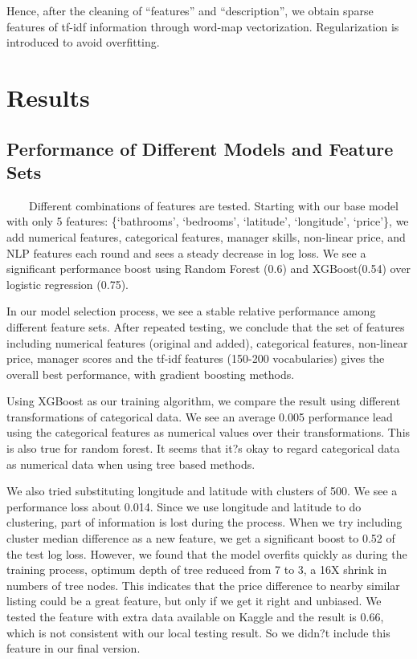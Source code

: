 \documentclass{article}
\begin{document}
Hence, after the cleaning of ``features'' and ``description'',  we obtain sparse features of tf-idf information through word-map vectorization. Regularization is introduced to avoid overfitting.

\section{Results} \label{results}

\subsection{Performance of Different Models and Feature Sets}

~~~~Different combinations of features are tested. Starting with our base model with only 5 features: \{`bathrooms', `bedrooms', `latitude', `longitude', `price'\}, we add numerical features, categorical features, manager skills, non-linear price, and NLP features each round and sees a steady decrease in log loss. We see a significant performance boost using Random Forest (0.6) and XGBoost(0.54) over logistic regression (0.75). 

In our model selection process, we see a stable relative performance among different feature sets. After repeated testing, we conclude that the set of features including numerical features (original and added), categorical features, non-linear price, manager scores and the tf-idf features (150-200 vocabularies) gives the overall best performance, with gradient boosting methods. %

Using XGBoost as our training algorithm, we compare the result using different transformations of categorical data. We see an average 0.005 performance lead using the categorical features as numerical values over their transformations. This is also true for random forest. It seems that it?s okay to regard categorical data as numerical data when using tree based methods. 

We also tried substituting longitude and latitude with clusters of 500. We see a performance loss about 0.014. Since we use longitude and latitude to do clustering, part of information is lost during the process. When we try including cluster median difference as a new feature, we get a significant boost to 0.52 of the test log loss. However, we found that the model overfits quickly as during the training process, optimum depth of tree reduced from 7 to 3, a 16X shrink in numbers of  tree nodes. This indicates that the price difference to nearby similar listing could be a great feature, but only if we get it right and unbiased. We tested the feature with extra data available on Kaggle and the result is 0.66, which is not consistent with our local testing result. So we didn?t include this feature in our final version.
\end{document}
